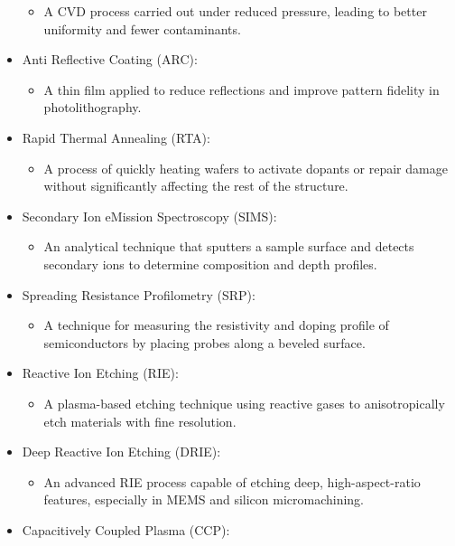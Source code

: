 \documentclass[
]{article}
\providecommand{\tightlist}{%
  \setlength{\itemsep}{0pt}\setlength{\parskip}{0pt}}
\begin{document}
\begin{itemize}
  \begin{itemize}
  \tightlist
  \item
    A CVD process carried out under reduced pressure, leading to better
    uniformity and fewer contaminants.
  \end{itemize}
\item
  Anti Reflective Coating (ARC):

  \begin{itemize}
  \tightlist
  \item
    A thin film applied to reduce reflections and improve pattern
    fidelity in photolithography.
  \end{itemize}
\item
  Rapid Thermal Annealing (RTA):

  \begin{itemize}
  \tightlist
  \item
    A process of quickly heating wafers to activate dopants or repair
    damage without significantly affecting the rest of the structure.
  \end{itemize}
\item
  Secondary Ion eMission Spectroscopy (SIMS):

  \begin{itemize}
  \tightlist
  \item
    An analytical technique that sputters a sample surface and detects
    secondary ions to determine composition and depth profiles.
  \end{itemize}
\item
  Spreading Resistance Profilometry (SRP):

  \begin{itemize}
  \tightlist
  \item
    A technique for measuring the resistivity and doping profile of
    semiconductors by placing probes along a beveled surface.
  \end{itemize}
\item
  Reactive Ion Etching (RIE):

  \begin{itemize}
  \tightlist
  \item
    A plasma-based etching technique using reactive gases to
    anisotropically etch materials with fine resolution.
  \end{itemize}
\item
  Deep Reactive Ion Etching (DRIE):

  \begin{itemize}
  \tightlist
  \item
    An advanced RIE process capable of etching deep, high-aspect-ratio
    features, especially in MEMS and silicon micromachining.
  \end{itemize}
\item
  Capacitively Coupled Plasma (CCP):


\end{itemize}
\end{document}
